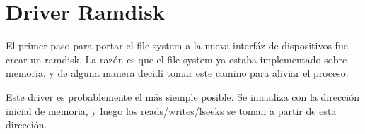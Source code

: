 \section{Driver Ramdisk}

El primer paso para portar el file system a la nueva interfáz de dispositivos
fue crear un ramdisk. La razón es que el file system ya estaba implementado
sobre memoria, y de alguna manera decidí tomar este camino para aliviar el
proceso.

Este driver es probablemente el más siemple posible. Se inicializa con la
dirección inicial de memoria, y luego los reads/writes/lseeks se toman a partir
de esta dirección.
